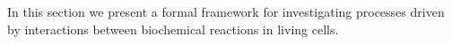 In this section we present a formal framework for investigating processes driven by interactions between biochemical reactions in living cells.